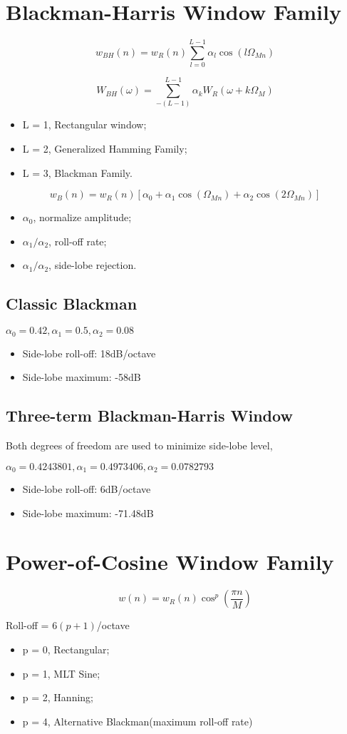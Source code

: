 \documentclass[11pt]{article}
\begin{document}
\section*{Blackman-Harris Window Family} \indent

\[w_{BH}(n) = w_R(n) \sum_{l=0}^{L-1} \alpha_l \cos(l\Omega_{Mn})\]

\[W_{BH}(\omega) = \sum_{-(L-1)}^{L-1} \alpha_k W_R(\omega + k\Omega_M)\]

\begin{itemize}
\item L = 1, Rectangular window;
\item L = 2, Generalized Hamming Family;
\item L = 3, Blackman Family.
\end{itemize}

\[w_B(n) = w_R(n)[\alpha_0 + \alpha_1 \cos(\Omega_{Mn}) + \alpha_2 \cos(2\Omega_{Mn})]\]

\begin{itemize}
\item $\alpha_0$, normalize amplitude;
\item $\alpha_1 / \alpha_2$, roll-off rate;
\item $\alpha_1 / \alpha_2$, side-lobe rejection.
\end{itemize}

\subsection*{Classic Blackman} \indent

$\alpha_0 = 0.42, \alpha_1 = 0.5, \alpha_2 = 0.08$

\begin{itemize}
\item Side-lobe roll-off: 18dB/octave
\item Side-lobe maximum: -58dB
\end{itemize}

\subsection*{Three-term Blackman-Harris Window} \indent

Both degrees of freedom are used to minimize side-lobe level,

$\alpha_0 = 0.4243801, \alpha_1 = 0.4973406, \alpha_2 = 0.0782793$

\begin{itemize}
\item Side-lobe roll-off: 6dB/octave
\item Side-lobe maximum: -71.48dB
\end{itemize}

\section*{Power-of-Cosine Window Family}

\[w(n) = w_R(n) \cos^p \left(\frac{\pi n}{M}\right)\]

Roll-off = $6(p + 1)$/octave

\begin{itemize}
\item p = 0, Rectangular;
\item p = 1, MLT Sine;
\item p = 2, Hanning;
\item p = 4, Alternative Blackman(maximum roll-off rate)
\end{itemize}
\end{document}
